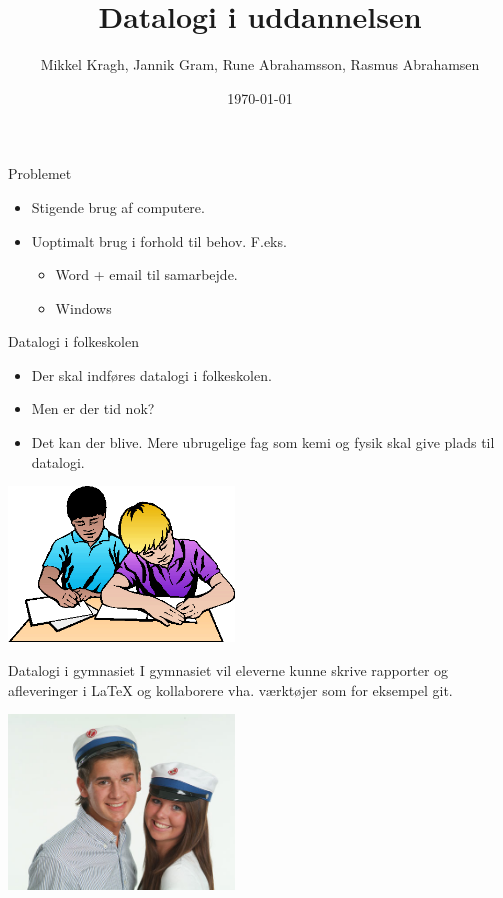 \documentclass{beamer}
\title[Datalogi i uddannelsen]{Datalogi i uddannelsen}
\author{Mikkel Kragh, Jannik Gram, Rune Abrahamsson, Rasmus Abrahamsen}
\institute{DIKU}
\date{\today}
\begin{document}
\begin{frame}
\titlepage
\end{frame}


\begin{frame}{Problemet}
\begin{itemize}
\item Stigende brug af computere.
\item Uoptimalt brug i forhold til behov. F.eks.
\begin{itemize}
\item Word + email til samarbejde.
\item Windows
\end{itemize}
\end{itemize}

\end{frame}

\begin{frame}{Datalogi i folkeskolen}

\begin{itemize}
\item Der skal indføres datalogi i folkeskolen.
\item Men er der tid nok?
\item Det kan der blive. Mere ubrugelige fag som kemi og fysik skal give plads til datalogi.
\end{itemize}

\includegraphics[width=60mm]{skole.png}

\end{frame}

\begin{frame}{Datalogi i gymnasiet}
I gymnasiet vil eleverne kunne skrive rapporter og afleveringer i LaTeX og kollaborere vha. værktøjer som for eksempel git.

\includegraphics[width=60mm]{gymnasie.png}

\end{frame}
\end{document}

